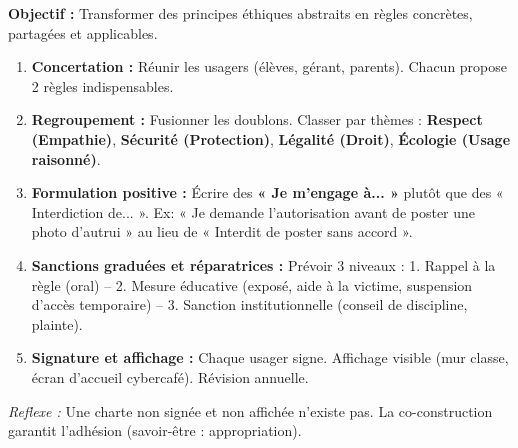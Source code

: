 \documentclass[11pt]{article}
\newcommand{\cle}[1]{{\popxbold\color{popdark}#1}}
\begin{document}
\begin{methode}
\textbf{Objectif :} Transformer des principes éthiques abstraits en règles concrètes, partagées et applicables.
\begin{enumerate}
    \item \textbf{Concertation :} Réunir les usagers (élèves, gérant, parents). Chacun propose 2 règles indispensables.
    \item \textbf{Regroupement :} Fusionner les doublons. Classer par thèmes : \textbf{Respect (Empathie)}, \textbf{Sécurité (Protection)}, \textbf{Légalité (Droit)}, \textbf{Écologie (Usage raisonné)}.
    \item \textbf{Formulation positive :} Écrire des \textbf{« Je m'engage à... »} plutôt que des « Interdiction de... ». Ex: « Je demande l'autorisation avant de poster une photo d'autrui » au lieu de « Interdit de poster sans accord ».
    \item \textbf{Sanctions graduées et réparatrices :} Prévoir 3 niveaux : 1. Rappel à la règle (oral) -- 2. Mesure éducative (exposé, aide à la victime, suspension d'accès temporaire) -- 3. Sanction institutionnelle (conseil de discipline, plainte).
    \item \textbf{Signature et affichage :} Chaque usager signe. Affichage visible (mur classe, écran d'accueil cybercafé). Révision annuelle.
\end{enumerate}
\emph{Reflexe :} Une charte non signée et non affichée n'existe pas. La \cle{co-construction} garantit l'adhésion (savoir-être : appropriation).
\end{methode}
\end{document}
